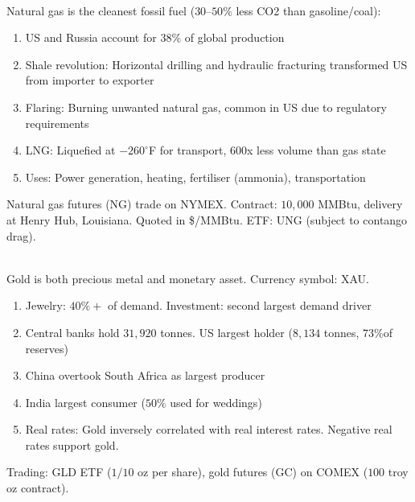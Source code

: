 \documentclass[a4paper,oneside,openany]{book}
\begin{document}
\begin{remark} \\
Natural gas is the cleanest fossil fuel ($30$--$50\%$ less CO2 than gasoline/coal):
\begin{enumerate}[label=\roman*.]
\setlength{\itemsep}{0pt}
\item US and Russia account for $38\%$ of global production
\item Shale revolution: Horizontal drilling and hydraulic fracturing transformed US from importer to exporter
\item Flaring: Burning unwanted natural gas, common in US due to regulatory requirements
\item LNG: Liquefied at $-260^\circ$F for transport, 600x less volume than gas state
\item Uses: Power generation, heating, fertiliser (ammonia), transportation
\end{enumerate}
Natural gas futures (NG) trade on NYMEX. Contract: $10,000$ MMBtu, delivery at Henry Hub, Louisiana. Quoted in \$/MMBtu. ETF: UNG (subject to contango drag).
\end{remark}

\begin{remark} \\
Gold is both precious metal and monetary asset. Currency symbol: XAU.
\begin{enumerate}[label=\roman*.]
\setlength{\itemsep}{0pt}
\item Jewelry: $40\%+$ of demand. Investment: second largest demand driver
\item Central banks hold $31,920$ tonnes. US largest holder ($8,134$ tonnes, $73\% $of reserves)
\item China overtook South Africa as largest producer
\item India largest consumer ($50\%$ used for weddings)
\item Real rates: Gold inversely correlated with real interest rates. Negative real rates support gold.
\end{enumerate}
Trading: GLD ETF ($1/10$ oz per share), gold futures (GC) on COMEX ($100$ troy oz contract).
\end{remark}
\end{document}
